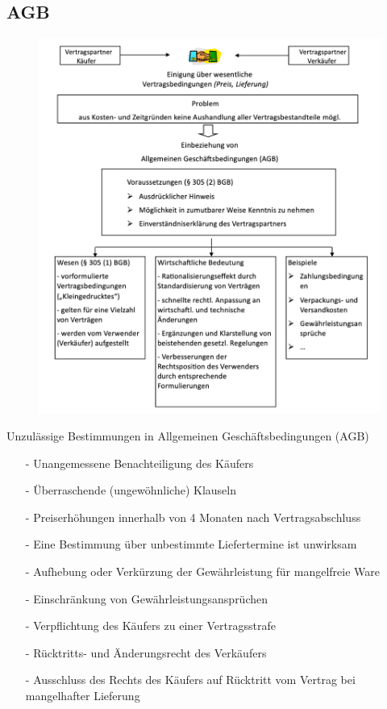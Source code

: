\documentclass[10pt]{article}
\begin{document}
\subsection{AGB}
\begin{figure}[H]
\begin{center}
  \includegraphics[width=12cm]{AGB.png}
  \end{center}
  \label{fig:AGB.png}
\end{figure} 

Unzulässige Bestimmungen in Allgemeinen Geschäftsbedingungen (AGB)
\begin{itemize}
    \item[-] Unangemessene Benachteiligung des Käufers
    \item[-]  Überraschende (ungewöhnliche) Klauseln
    \item[-]  Preiserhöhungen innerhalb von 4 Monaten nach Vertragsabschluss
    \item[-] Eine Bestimmung über unbestimmte Liefertermine ist unwirksam 
    \item[-]  Aufhebung oder Verkürzung der Gewährleistung für mangelfreie Ware
    \item[-]  Einschränkung von Gewährleistungsansprüchen 
    \item[-] Verpflichtung des Käufers zu einer Vertragsstrafe
    \item[-]  Rücktritts- und Änderungsrecht des Verkäufers
    \item[-]   Ausschluss des Rechts des Käufers auf Rücktritt vom Vertrag bei mangelhafter Lieferung  
\end{itemize}
\end{document}
